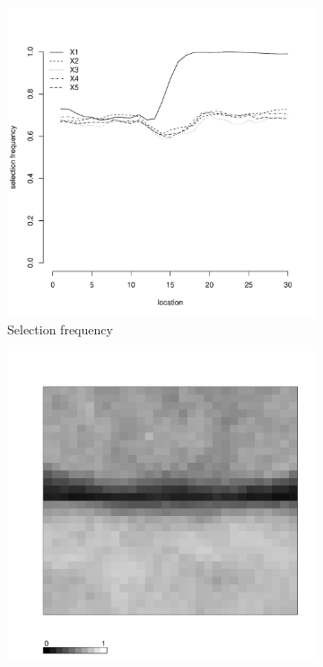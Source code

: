 \documentclass[authoryear, review, 11pt]{elsarticle}
\begin{document}
\begin{figure}
\begin{subfigure}[b]{0.45\textwidth}
		\includegraphics[width=\textwidth]{../../figures/simulation/15.5.profile_selection.pdf}
		\caption{Selection frequency}
	\end{subfigure}
	\begin{subfigure}[b]{0.45\textwidth}
	\centering
		\includegraphics[width=\textwidth]{../../figures/simulation/X1.15.5.unshrunk_bootstrap_coverage.pdf}

\end{subfigure}
\end{figure}
\end{document}
